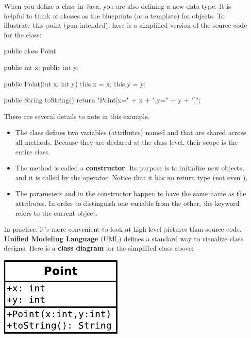 When you define a class in Java, you are also defining a new data type.
It is helpful to think of classes as the blueprints (or a template) for objects.
To illustrate this point (pun intended), here is a simplified version of the source code for the  class:

\begin{code}
public class Point {

    public int x;
    public int y;

    public Point(int x, int y) {
        this.x = x;
        this.y = y;
    }

    public String toString() {
        return "Point[x=" + x + ",y=" + y + "]";
    }

}
\end{code}

There are several details to note in this example.

\begin{itemize}

\item The class defines two variables (attributes) named  and  that are shared across all methods.
Because they are declared at the class level, their scope is the entire class.

\item The method  is called a {\bf constructor}.
Its purpose is to initialize new objects, and it is called by the  operator.
Notice that it has no return type (not even ).

\item The parameters  and  in the constructor happen to have the same name as the attributes.
In order to distinguish one variable from the other, the keyword  refers to the current object.


\end{itemize}

In practice, it's more convenient to look at high-level pictures than source code.
{\bf Unified Modeling Language} (UML) defines a standard way to visualize class designs.
Here is a {\bf class diagram} for the simplified  class above:

\begin{center}
\vspace{1ex}
\includegraphics{figs/point.pdf}
\vspace{1ex}
\end{center}

